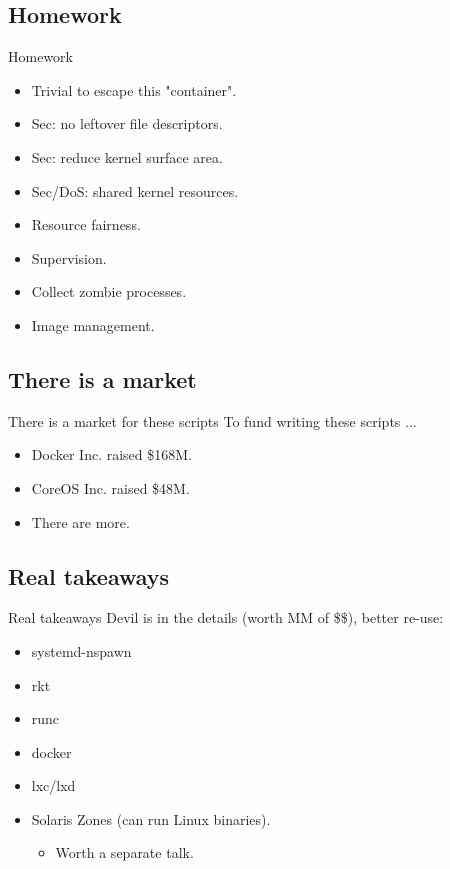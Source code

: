 \documentclass[14pt]{beamer}
\begin{document}
\subsection{Homework}
\begin{frame}{Homework}
    \begin{itemize}[<+(1)->]
        \item Trivial to escape this "container".
        \item Sec: no leftover file descriptors.
        \item Sec: reduce kernel surface area.
        \item Sec/DoS: shared kernel resources.
        \item Resource fairness.
        \item Supervision.
        \item Collect zombie processes.
        \item Image management.
    \end{itemize}
\end{frame}

\subsection{There is a market}
\begin{frame}{There is a market for these scripts}
    To fund writing these scripts ...
    \begin{itemize}[<+(1)->]
        \item Docker Inc. raised \$168M.
        \item CoreOS Inc. raised \$48M.
        \item There are more.
    \end{itemize}
\end{frame}

\subsection{Real takeaways}
\begin{frame}{Real takeaways}
    \pause
    Devil is in the details (worth MM of \$\$), better re-use:
    \begin{itemize}[<+(1)->]
        \item systemd-nspawn
        \item rkt
        \item runc
        \item docker
        \item lxc/lxd
        \item Solaris Zones (can run Linux binaries).
            \begin{itemize}
                \item Worth a separate talk.
            \end{itemize}
    \end{itemize}
\end{frame}
\end{document}
